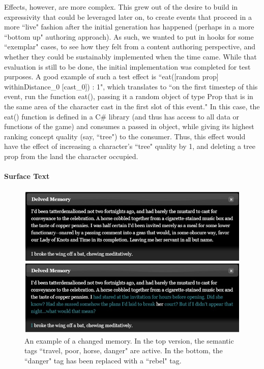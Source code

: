Effects, however, are more complex. This grew out of the desire to build in expressivity that could be leveraged later on, to create events that proceed in a more ``live" fashion after the initial generation has happened (perhaps in a more ``bottom up" authoring approach). As such, we wanted to put in hooks for some ``exemplar" cases, to see how they felt from a content authoring perspective, and whether they could be sustainably implemented when the time came. While that evaluation is still to be done, the initial implementation was completed for test purposes. A good example of such a test effect is ``eat([random prop] withinDistance\_0 [cast\_0]) : 1", which translates to ``on the first timestep of this event, run the function eat(), passing it a random object of type Prop that is in the same area of the character cast in the first slot of this event." In this case, the eat() function is defined in a C\# library (and thus has access to all data or functions of the game) and consumes a passed in object, while giving its highest ranking concept quality (say, ``tree") to the consumer. Thus, this effect would have the effect of increasing a character's ``tree" quality by 1, and deleting a tree prop from the land the character occupied.

\paragraph{Surface Text}\label{par:delve-implementation-surface-text}


\begin{figure}
    \centering
    \includegraphics[width=12cm]{figures/4-Delve/memory-detail-changed.jpg}
    \caption{An example of a changed memory. In the top version, the semantic tags ``travel, poor, horse, danger" are active. In the bottom, the ``danger" tag has been replaced with a ``rebel" tag.}
    \label{fig:memory-detail-changed}
\end{figure}

